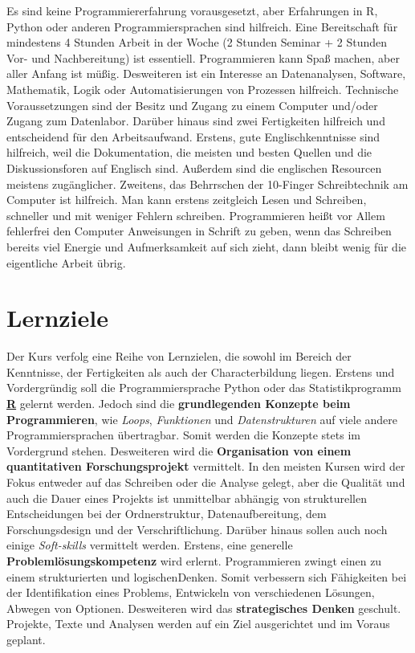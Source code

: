 Es sind keine Programmiererfahrung vorausgesetzt, aber Erfahrungen in R,
Python oder anderen Programmiersprachen sind hilfreich. Eine
Bereitschaft für mindestens 4 Stunden Arbeit in der Woche (2 Stunden
Seminar + 2 Stunden Vor- und Nachbereitung) ist essentiell.
Programmieren kann Spaß machen, aber aller Anfang ist müßig. Desweiteren
ist ein Interesse an Datenanalysen, Software, Mathematik, Logik oder
Automatisierungen von Prozessen hilfreich. Technische Voraussetzungen
sind der Besitz und Zugang zu einem Computer und/oder Zugang zum
Datenlabor. Darüber hinaus sind zwei Fertigkeiten hilfreich und
entscheidend für den Arbeitsaufwand. Erstens, gute Englischkenntnisse
sind hilfreich, weil die Dokumentation, die meisten und besten Quellen
und die Diskussionsforen auf Englisch sind. Außerdem sind die englischen
Resourcen meistens zugänglicher. Zweitens, das Behrrschen der 10-Finger
Schreibtechnik am Computer ist hilfreich. Man kann erstens zeitgleich
Lesen und Schreiben, schneller und mit weniger Fehlern schreiben.
Programmieren heißt vor Allem fehlerfrei den Computer Anweisungen in
Schrift zu geben, wenn das Schreiben bereits viel Energie und
Aufmerksamkeit auf sich zieht, dann bleibt wenig für die eigentliche
Arbeit übrig.

\section{Lernziele}\label{lernziele}

Der Kurs verfolg eine Reihe von Lernzielen, die sowohl im Bereich der
Kenntnisse, der Fertigkeiten als auch der Characterbildung liegen.
Erstens und Vordergründig soll die Programmiersprache Python oder das
Statistikprogramm \href{https://www.r-project.org/}{\textbf{R}} gelernt
werden. Jedoch sind die \textbf{grundlegenden Konzepte beim
Programmieren}, wie \emph{Loops}, \emph{Funktionen} und
\emph{Datenstrukturen} auf viele andere Programmiersprachen übertragbar.
Somit werden die Konzepte stets im Vordergrund stehen. Desweiteren wird
die \textbf{Organisation von einem quantitativen Forschungsprojekt}
vermittelt. In den meisten Kursen wird der Fokus entweder auf das
Schreiben oder die Analyse gelegt, aber die Qualität und auch die Dauer
eines Projekts ist unmittelbar abhängig von strukturellen Entscheidungen
bei der Ordnerstruktur, Datenaufbereitung, dem Forschungsdesign und der
Verschriftlichung. Darüber hinaus sollen auch noch einige
\emph{Soft-skills} vermittelt werden. Erstens, eine generelle
\textbf{Problemlösungskompetenz} wird erlernt. Programmieren zwingt
einen zu einem strukturierten und logischenDenken. Somit verbessern sich
Fähigkeiten bei der Identifikation eines Problems, Entwickeln von
verschiedenen Lösungen, Abwegen von Optionen. Desweiteren wird das
\textbf{strategisches Denken} geschult. Projekte, Texte und Analysen
werden auf ein Ziel ausgerichtet und im Voraus geplant.

